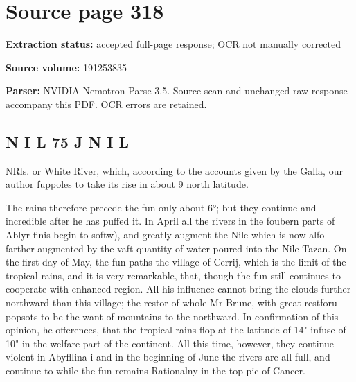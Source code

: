 \clearpage
\section{Source page 318}
\textbf{Extraction status:} accepted full-page response; OCR not manually corrected\par
\textbf{Source volume:} 191253835\par
\textbf{Parser:} NVIDIA Nemotron Parse 3.5. Source scan and unchanged raw response accompany this PDF. OCR errors are retained.\par\medskip
\subsection*{N I L 75 J N I L}
NRls. or White River, which, according to the accounts given by the Galla, our author fuppoles to take its rise in about 9 north latitude.\par\medskip
The rains therefore precede the fun only about 6°; but they continue and incredible after he has puffed it. In April all the rivers in the foubern parts of Ablyr finis begin to softw), and greatly augment the Nile which is now alfo farther augmented by the vaft quantity of water poured into the Nile Tazan. On the first day of May, the fun paths the village of Cerrij, which is the limit of the tropical rains, and it is very remarkable, that, though the fun still continues to cooperate with enhanced region. All his influence cannot bring the clouds further northward than this village; the restor of whole Mr Brune, with great restforu popsots to be the want of mountains to the northward. In confirmation of this opinion, he offerences, that the tropical rains flop at the latitude of 14" infuse of 10" in the welfare part of the continent. All this time, however, they continue violent in Abyfllina i and in the beginning of June the rivers are all full, and continue to while the fun remains Rationalny in the top pic of Cancer.\par\medskip
